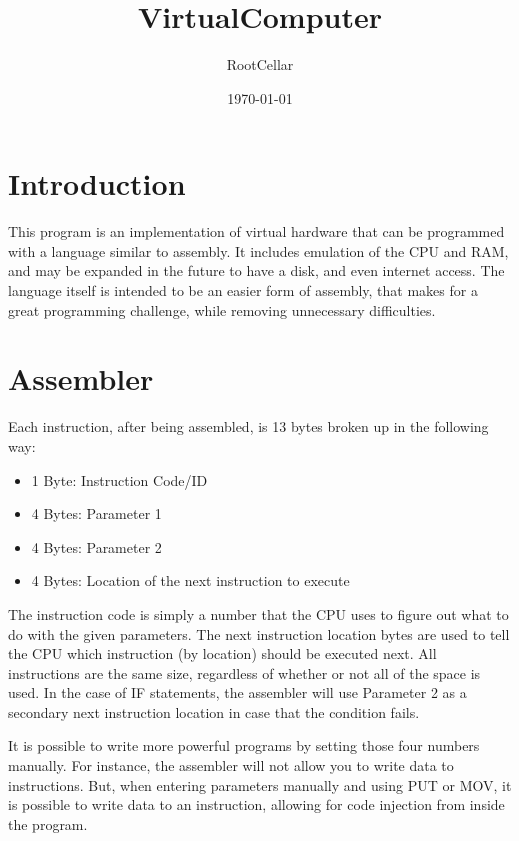 \documentclass[12pt]{article}
\title{VirtualComputer}
\author{RootCellar}
\date{\today}
\begin{document}
\maketitle

\section{Introduction}

This program is an implementation of virtual hardware that can be programmed with a language similar to assembly.
It includes emulation of the CPU and RAM, and may be expanded in the future to have a disk, and even internet access.
The language itself is intended to be an easier form of assembly, that makes for a great programming challenge, while
removing unnecessary difficulties.

\section{Assembler}

\vspace{12pt}

Each instruction, after being assembled, is 13 bytes broken up in the following way:
\begin{itemize}

\item
1 Byte: Instruction Code/ID

\item
4 Bytes: Parameter 1

\item
4 Bytes: Parameter 2

\item
4 Bytes: Location of the next instruction to execute

\end{itemize}

\vspace{12pt}

The instruction code is simply a number that the CPU uses to figure out what to do with the given parameters.
The next instruction location bytes are used to tell the CPU which instruction (by location) should be executed next.
All instructions are the same size, regardless of whether or not all of the space is used.
In the case of IF statements, the assembler will use Parameter 2 as a secondary next instruction location
in case that the condition fails.

It is possible to write more powerful programs by setting those four numbers manually. For instance,
the assembler will not allow you to write data to instructions. But, when entering parameters manually and using PUT or MOV, it is possible
to write data to an instruction, allowing for code injection from inside the program.
\end{document}
